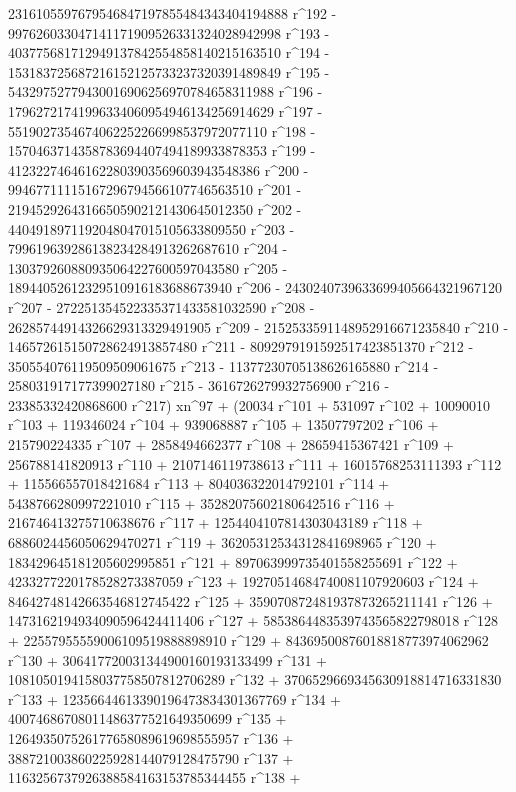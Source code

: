        2316105597679546847197855484343404194888 r^192 - 
       997626033047141171909526331324028942998 r^193 - 
       403775681712949137842554858140215163510 r^194 - 
       153183725687216152125733237320391489849 r^195 - 
       54329752779430016906256970784658311988 r^196 - 
       17962721741996334060954946134256914629 r^197 - 
       5519027354674062252266998537972077110 r^198 - 
       1570463714358783694407494189933878353 r^199 - 
       412322746461622803903569603943548386 r^200 - 
       99467711115167296794566107746563510 r^201 - 
       21945292643166505902121430645012350 r^202 - 
       4404918971192048047015105633809550 r^203 - 
       799619639286138234284913262687610 r^204 - 
       130379260880935064227600597043580 r^205 - 
       18944052612329510916183688673940 r^206 - 
       2430240739633699405664321967120 r^207 - 
       272251354522335371433581032590 r^208 - 
       26285744914326629313329491905 r^209 - 
       2152533591148952916671235840 r^210 - 
       146572615150728624913857480 r^211 - 
       8092979191592517423851370 r^212 - 
       350554076119509509061675 r^213 - 
       11377230705138626165880 r^214 - 258031917177399027180 r^215 - 
       3616726279932756900 r^216 - 
       23385332420868600 r^217) xn^97 + (20034 r^101 + 531097 r^102 + 
       10090010 r^103 + 119346024 r^104 + 939068887 r^105 + 
       13507797202 r^106 + 215790224335 r^107 + 2858494662377 r^108 + 
       28659415367421 r^109 + 256788141820913 r^110 + 
       2107146119738613 r^111 + 16015768253111393 r^112 + 
       115566557018421684 r^113 + 804036322014792101 r^114 + 
       5438766280997221010 r^115 + 35282075602180642516 r^116 + 
       216746413275710638676 r^117 + 1254404107814303043189 r^118 + 
       6886024456050629470271 r^119 + 36205312534312841698965 r^120 + 
       183429645181205602995851 r^121 + 
       897063999735401558255691 r^122 + 
       4233277220178528273387059 r^123 + 
       19270514684740081107920603 r^124 + 
       84642748142663546812745422 r^125 + 
       359070872481937873265211141 r^126 + 
       1473162194934090596424411406 r^127 + 
       5853864483539743565822798018 r^128 + 
       22557955559006109519888898910 r^129 + 
       84369500876018818773974062962 r^130 + 
       306417720031344900160193133499 r^131 + 
       1081050194158037758507812706289 r^132 + 
       3706529669345630918814716331830 r^133 + 
       12356644613390196473834301367769 r^134 + 
       40074686708011486377521649350699 r^135 + 
       126493507526177658089619698555957 r^136 + 
       388721003860225928144079128475790 r^137 + 
       1163256737926388584163153785344455 r^138 + 
